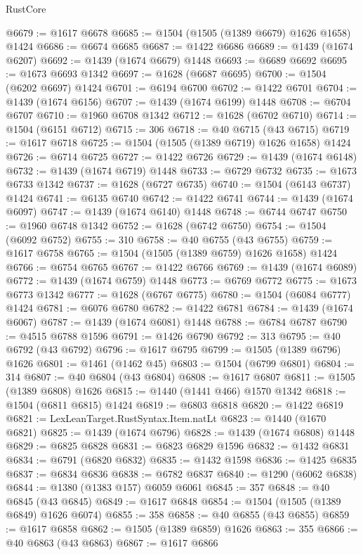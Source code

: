 \begin{lexlean}{RustCore}
\begin{coremodule}
@6679 := @1617 @6678
@6685 := @1504 (@1505 (@1389 @6679) @1626 @1658) @1424
@6686 := @6674 @6685
@6687 := @1422 @6686
@6689 := @1439 (@1674 @6207)
@6692 := @1439 (@1674 @6679) @1448
@6693 := @6689 @6692
@6695 := @1673 @6693 @1342
@6697 := @1628 (@6687 @6695)
@6700 := @1504 (@6202 @6697) @1424
@6701 := @6194 @6700
@6702 := @1422 @6701
@6704 := @1439 (@1674 @6156)
@6707 := @1439 (@1674 @6199) @1448
@6708 := @6704 @6707
@6710 := @1960 @6708 @1342
@6712 := @1628 (@6702 @6710)
@6714 := @1504 (@6151 @6712)
@6715 := 306
@6718 := @40 @6715 (@43 @6715)
@6719 := @1617 @6718
@6725 := @1504 (@1505 (@1389 @6719) @1626 @1658) @1424
@6726 := @6714 @6725
@6727 := @1422 @6726
@6729 := @1439 (@1674 @6148)
@6732 := @1439 (@1674 @6719) @1448
@6733 := @6729 @6732
@6735 := @1673 @6733 @1342
@6737 := @1628 (@6727 @6735)
@6740 := @1504 (@6143 @6737) @1424
@6741 := @6135 @6740
@6742 := @1422 @6741
@6744 := @1439 (@1674 @6097)
@6747 := @1439 (@1674 @6140) @1448
@6748 := @6744 @6747
@6750 := @1960 @6748 @1342
@6752 := @1628 (@6742 @6750)
@6754 := @1504 (@6092 @6752)
@6755 := 310
@6758 := @40 @6755 (@43 @6755)
@6759 := @1617 @6758
@6765 := @1504 (@1505 (@1389 @6759) @1626 @1658) @1424
@6766 := @6754 @6765
@6767 := @1422 @6766
@6769 := @1439 (@1674 @6089)
@6772 := @1439 (@1674 @6759) @1448
@6773 := @6769 @6772
@6775 := @1673 @6773 @1342
@6777 := @1628 (@6767 @6775)
@6780 := @1504 (@6084 @6777) @1424
@6781 := @6076 @6780
@6782 := @1422 @6781
@6784 := @1439 (@1674 @6067)
@6787 := @1439 (@1674 @6081) @1448
@6788 := @6784 @6787
@6790 := @4515 @6788 @1596
@6791 := @1426 @6790
@6792 := 313
@6795 := @40 @6792 (@43 @6792)
@6796 := @1617 @6795
@6799 := @1505 (@1389 @6796) @1626
@6801 := @1461 (@1462 @45)
@6803 := @1504 (@6799 @6801)
@6804 := 314
@6807 := @40 @6804 (@43 @6804)
@6808 := @1617 @6807
@6811 := @1505 (@1389 @6808) @1626
@6815 := @1440 (@1441 @466) @1570 @1342
@6818 := @1504 (@6811 @6815) @1424
@6819 := @6803 @6818
@6820 := @1422 @6819
@6821 := LexLeanTarget.RustSyntax.Item.natLt
@6823 := @1440 (@1670 @6821)
@6825 := @1439 (@1674 @6796)
@6828 := @1439 (@1674 @6808) @1448
@6829 := @6825 @6828
@6831 := @6823 @6829 @1596
@6832 := @1432 @6831
@6834 := @6791 (@6820 @6832)
@6835 := @1432 @1598
@6836 := @1425 @6835
@6837 := @6834 @6836
@6838 := @6782 @6837
@6840 := @1290 (@6062 @6838)
@6844 := @1380 (@1383 @157) @6059 @6061
@6845 := 357
@6848 := @40 @6845 (@43 @6845)
@6849 := @1617 @6848
@6854 := @1504 (@1505 (@1389 @6849) @1626 @6074)
@6855 := 358
@6858 := @40 @6855 (@43 @6855)
@6859 := @1617 @6858
@6862 := @1505 (@1389 @6859) @1626
@6863 := 355
@6866 := @40 @6863 (@43 @6863)
@6867 := @1617 @6866

\end{coremodule}
\end{lexlean}
